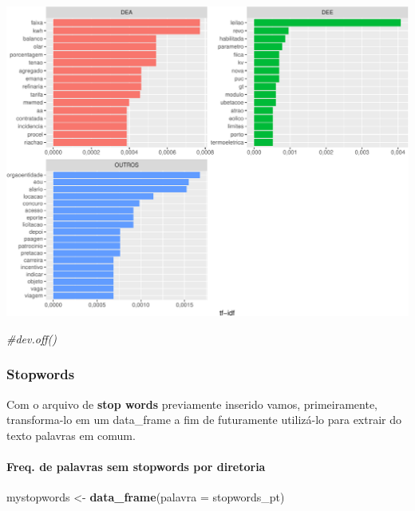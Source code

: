 \documentclass[]{article}
\newenvironment{Shaded}{\begin{snugshade}}{\end{snugshade}}
\newcommand{\KeywordTok}[1]{\textcolor[rgb]{0.13,0.29,0.53}{\textbf{#1}}}
\newcommand{\DataTypeTok}[1]{\textcolor[rgb]{0.13,0.29,0.53}{#1}}
\newcommand{\StringTok}[1]{\textcolor[rgb]{0.31,0.60,0.02}{#1}}
\newcommand{\CommentTok}[1]{\textcolor[rgb]{0.56,0.35,0.01}{\textit{#1}}}
\newcommand{\NormalTok}[1]{#1}
\let\oldparagraph\paragraph
\renewcommand{\paragraph}[1]{\oldparagraph{#1}\mbox{}}
\begin{document}
\includegraphics{markdown_v40_files/figure-latex/unnamed-chunk-50-1.pdf}

\begin{Shaded}
\begin{Highlighting}[]
\CommentTok{#dev.off()}
\end{Highlighting}
\end{Shaded}

\subsubsection{Stopwords}\label{stopwords}

Com o arquivo de \textbf{stop words} previamente inserido vamos,
primeiramente, transforma-lo em um data\_frame a fim de futuramente
utilizá-lo para extrair do texto palavras em comum.

\paragraph{\texorpdfstring{Freq. de palavras sem \textbf{stopwords} por
diretoria}{Freq. de palavras sem stopwords por diretoria}}\label{freq.-de-palavras-sem-stopwords-por-diretoria}

\begin{Shaded}
\begin{Highlighting}[]
\NormalTok{mystopwords <-}\StringTok{ }\KeywordTok{data_frame}\NormalTok{(}\DataTypeTok{palavra =}\NormalTok{ stopwords_pt)}
\end{Highlighting}
\end{Shaded}
\end{document}
